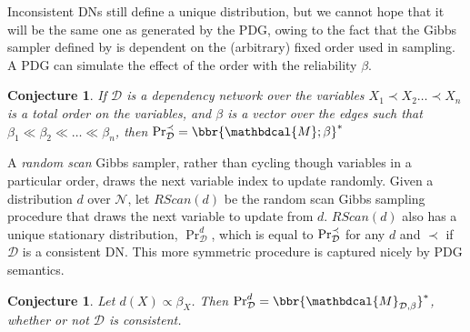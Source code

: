 \documentclass[letterpaper]{article} %
\theoremstyle{plain}
\newtheorem{conj}[theorem]{Conjecture}
\theoremstyle{definition}
\theoremstyle{remark}
\newcommand{\dg}[1]{\mathbdcal{#1}}
\newcommand{\N}{\mathcal N}
\newcommand{\PDGof}[1]{{\dg M}_{#1}}
\begin{document}
Inconsistent DNs still define a unique distribution, but we cannot hope that it 
will be the same one as generated by the PDG, owing to the fact that
the Gibbs sampler defined by \citeauthor{heckerman2000dependency} is dependent
on the (arbitrary) fixed order used in sampling.
A PDG can simulate the effect of the order with the reliability $\beta$.

\begin{conj}
If $\mathcal D$ is a dependency network over the variables
$X_1 \prec X_2  \ldots  \prec X_n$ is a total order on the variables, and $\beta$ is a vector over the edges
such that  $\beta_1 \ll\beta_2 \ll \ldots \ll \beta_n$, 
then $\Pr_{\cal D}^{\prec} = \bbr{\dg M; \beta}^*$
\end{conj}

A \emph{random scan} Gibbs sampler, rather than cycling though variables in a 
particular order, draws the next variable index to update randomly.
Given a distribution $d$ over $\N$,
let $\mathit{RScan}(d)$ be the random scan Gibbs sampling procedure that draws
the next variable to update from $d$. $\mathit{RScan}(d)$ also has a unique stationary distribution, $\Pr_{\mathcal D}^d$, which is equal to $\Pr_{\cal D}^{\prec}$ for any $d$ and $\prec$ if $\mathcal D$ is a consistent DN. This more symmetric procedure is captured nicely by PDG semantics.

\begin{conj}\label{thm:dns-are-completely-pdgs}
	Let $d(X) \propto \beta_X$. Then
	$\Pr_{\mathcal D}^d = \bbr{\PDGof{\mathcal D, \beta}}^*$, whether or not $\mathcal D$ is consistent.
\end{conj}

\end{document}
